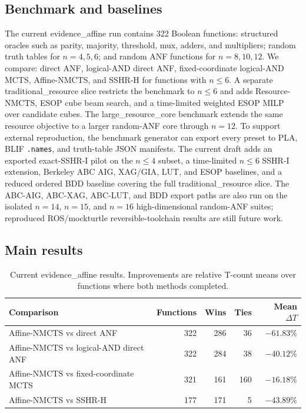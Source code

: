 \documentclass[11pt]{article}
\newcommand{\method}{Resource-NMCTS}
\newcommand{\affinemethod}{Affine-NMCTS}
\newcommand{\dataset}{evidence\_affine}
\newcommand{\traditionaldataset}{traditional\_resource}
\newcommand{\largedataset}{large\_resource\_core}
\begin{document}
\subsection{Benchmark and baselines}

The current \dataset{} run contains 322 Boolean functions: structured oracles
such as parity, majority, threshold, mux, adders, and multipliers; random truth
tables for $n=4,5,6$; and random ANF functions for $n=8,10,12$.  We compare:
direct ANF, logical-AND direct ANF, fixed-coordinate logical-AND MCTS,
\affinemethod{}, and SSHR-H for functions with $n\leq 6$.
A separate \traditionaldataset{} slice restricts the benchmark to $n\leq 6$
and adds \method{}, ESOP cube beam search, and a time-limited weighted ESOP
MILP over candidate cubes.  The \largedataset{} benchmark extends the same
resource objective to a larger random-ANF core through $n=12$.  To support
external reproduction, the benchmark generator can export every preset to PLA,
BLIF \texttt{.names}, and truth-table JSON manifests.  The current draft adds
an exported exact-SSHR-I pilot on the $n\leq 4$ subset, a time-limited
$n\leq 6$ SSHR-I extension, Berkeley ABC AIG, XAG/GIA, LUT, and ESOP
baselines, and a reduced ordered BDD baseline covering the full
\traditionaldataset{} slice.  The ABC-AIG, ABC-XAG, ABC-LUT, and BDD export
paths are also run on the isolated $n=14$, $n=15$, and $n=16$
high-dimensional random-ANF suites; reproduced ROS/mockturtle
reversible-toolchain results are still future work.

\subsection{Main results}

\begin{table}[t]
\centering
\caption{Current \dataset{} results.  Improvements are relative T-count means
over functions where both methods completed.}
\label{tab:main-results}
\begin{tabular}{lrrrr}
\toprule
Comparison & Functions & Wins & Ties & Mean $\Delta T$ \\
\midrule
\affinemethod{} vs direct ANF & 322 & 286 & 36 & $-61.83\%$ \\
\affinemethod{} vs logical-AND direct ANF & 322 & 284 & 38 & $-40.12\%$ \\
\affinemethod{} vs fixed-coordinate MCTS & 321 & 161 & 160 & $-16.18\%$ \\
\affinemethod{} vs SSHR-H & 177 & 171 & 5 & $-43.89\%$ \\
\bottomrule
\end{tabular}
\end{table}
\end{document}

